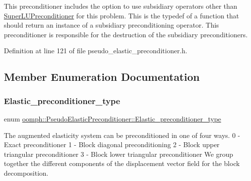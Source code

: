 This preconditioner includes the option to use subsidiary operators other than \hyperlink{classoomph_1_1SuperLUPreconditioner}{Super\+L\+U\+Preconditioner} for this problem. This is the typedef of a function that should return an instance of a subsidiary preconditioning operator. This preconditioner is responsible for the destruction of the subsidiary preconditioners. 



Definition at line 121 of file pseudo\+\_\+elastic\+\_\+preconditioner.\+h.



\subsection{Member Enumeration Documentation}
\mbox{\label{classoomph_1_1PseudoElasticPreconditioner_acde733e1a111a961d1e714add4e8015d}} 
\subsubsection{\texorpdfstring{Elastic\+\_\+preconditioner\+\_\+type}{Elastic\_preconditioner\_type}}
{\footnotesize\ttfamily enum \hyperlink{classoomph_1_1PseudoElasticPreconditioner_acde733e1a111a961d1e714add4e8015d}{oomph\+::\+Pseudo\+Elastic\+Preconditioner\+::\+Elastic\+\_\+preconditioner\+\_\+type}}



The augmented elasticity system can be preconditioned in one of four ways. 0 -\/ Exact preconditioner 1 -\/ Block diagonal preconditioning 2 -\/ Block upper triangular preconditioner 3 -\/ Block lower triangular preconditioner We group together the different components of the displacement vector field for the block decomposition. 

